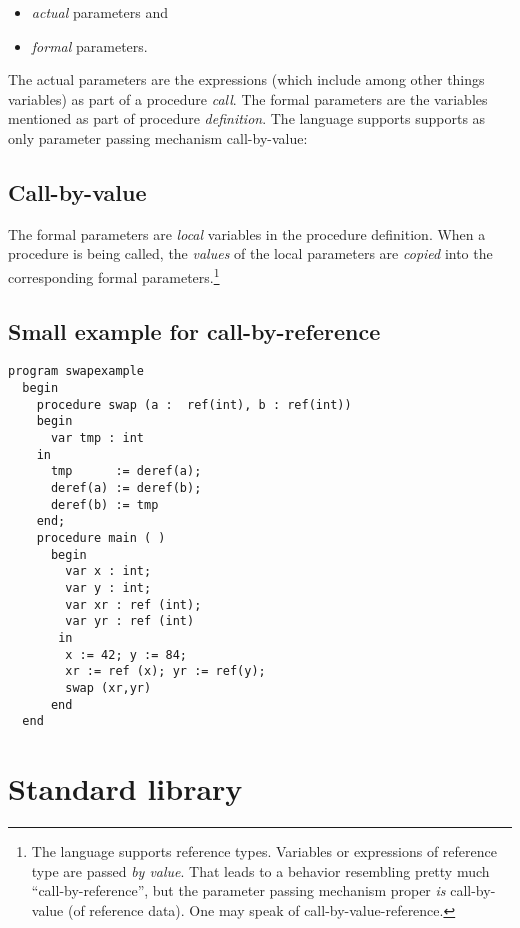 \documentclass[11pt]{article}
\begin{document}
\begin{itemize}
\item \emph{actual} parameters and
\item \emph{formal} parameters.
\end{itemize}


The actual parameters are the expressions (which include among other things
variables) as part of a procedure \emph{call}. The formal parameters are the
variables mentioned as part of procedure \emph{definition}. The language
supports supports as only parameter passing mechanism call-by-value:

\subsection{Call-by-value}
\label{sec:org622cd66}

The formal parameters are \emph{local} variables in the procedure
definition. When a procedure is being called, the \emph{values} of the local
parameters are \emph{copied} into the corresponding formal parameters.\footnote{The language supports reference types. Variables or expressions of
reference type are passed \emph{by value}. That leads to a behavior resembling
pretty much ``call-by-reference'', but the parameter passing mechanism
proper \emph{is} call-by-value (of reference data). One may speak of
call-by-value-reference.}


\subsection{Small example for call-by-reference}
\label{sec:orge3e029f}


\lstset{language=compila,label= ,caption= ,captionpos=b,numbers=none}
\begin{lstlisting}
program swapexample
  begin
    procedure swap (a :  ref(int), b : ref(int)) 
    begin
      var tmp : int
    in
      tmp      := deref(a);
      deref(a) := deref(b);
      deref(b) := tmp
    end;
    procedure main ( ) 
      begin
        var x : int;
        var y : int; 
        var xr : ref (int);
        var yr : ref (int)
       in
        x := 42; y := 84;
        xr := ref (x); yr := ref(y);
        swap (xr,yr)
      end
  end
\end{lstlisting}


\section{Standard library}
\label{sec:orgad017b1}
\end{document}

